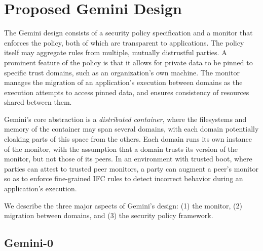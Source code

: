 \section{Proposed Gemini Design}
\label{sec:gemini-design}
%
%

The Gemini design consists of a security policy specification and a monitor
that enforces the policy, both of which are transparent to applications.
%
The policy itself may aggregate rules from multiple, mutually
distrustful parties.
%
A prominent feature of the policy is that it allows for private data to be pinned
to specific trust domains, such as an organization's own machine.
%
The monitor manages the migration of an application's execution between domains
as the execution attempts to access pinned data, and ensures consistency of
resources shared between them.


Gemini's core abstraction is a \emph{distributed container},
where the filesystems and memory of the container may span several
domains, with each domain potentially cloaking parts of this space from the
others.
%
Each domain runs its own instance of the monitor, with the assumption that a
domain trusts its version of the monitor, but not those of its peers.
%
In an environment with trusted boot, where parties can attest to trusted peer
monitors, a party can augment a peer's monitor so as to enforce fine-grained
IFC rules to detect incorrect behavior during an application's execution.


We describe the three major aspects of Gemini's design: (1) the monitor, (2)
migration between domains, and (3) the security policy framework.
%
%


\subsection{Gemini-0}

